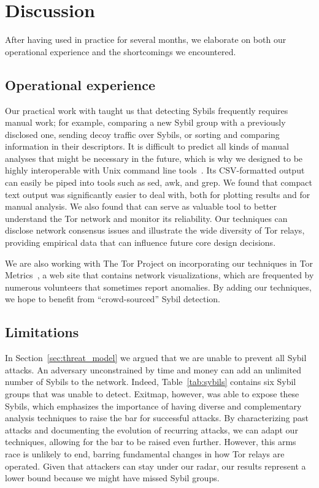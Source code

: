 \section{Discussion}
\label{sec:discussion}
After having used \sys in practice for several months, we elaborate on both our
operational experience and the shortcomings we encountered.

\subsection{Operational experience}
\label{sec:operational}
Our practical work with \sys taught us that detecting Sybils frequently requires
manual work; for example, comparing a new Sybil group with a previously
disclosed one, sending decoy traffic over Sybils, or sorting and comparing
information in their descriptors.  It is difficult to predict all kinds of
manual analyses that might be necessary in the future, which is why we designed
\sys to be highly interoperable with Unix command line tools~\cite{Pike1983a}.
Its CSV-formatted output can easily be piped into tools such as sed, awk, and
grep.  We found that compact text output was significantly easier to deal with,
both for plotting results and for manual analysis.  We also found that \sys can
serve as valuable tool to better understand the Tor network and monitor its
reliability.  Our techniques can disclose network consensus issues and
illustrate the wide diversity of Tor relays, providing empirical data that can
influence future core design decisions.

We are also working with The Tor Project on incorporating our techniques in
Tor Metrics~\cite{metrics}, a web site that contains network visualizations,
which are frequented by numerous volunteers that sometimes report anomalies.
By adding our techniques, we hope to benefit from ``crowd-sourced'' Sybil
detection.

\subsection{Limitations}
\label{sec:limitations}
In Section~\ref{sec:threat_model} we argued that we are unable to prevent all
Sybil attacks.  An adversary unconstrained by time and money can add an
unlimited number of Sybils to the network.  Indeed, Table~\ref{tab:sybils}
contains six Sybil groups that \sys was unable to detect.  Exitmap, however, was
able to expose these Sybils, which emphasizes the importance of having diverse
and complementary analysis techniques to raise the bar for successful attacks.
By characterizing past attacks and documenting the evolution of recurring
attacks, we can adapt our techniques, allowing for the bar to be raised even
further.  However, this arms race is unlikely to end, barring fundamental
changes in how Tor relays are operated.  Given that attackers can stay under our
radar, our results represent a lower bound because we might have missed Sybil
groups.

